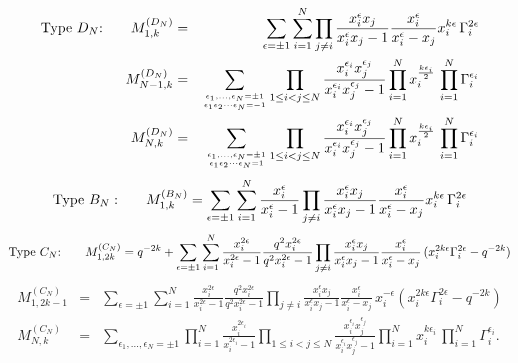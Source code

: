 \documentclass[12pt]{amsart}
\numberwithin{equation}{section}
\numberwithin{table}{section}
\begin{document}
\begin{eqnarray}\hbox{Type $D_N$:}\qquad
{M}_{1,k}^{(D_N)}&=&\sum_{\epsilon=\pm 1}\sum_{i=1}^N \prod_{j\neq i} \frac{x_i^\epsilon x_j}{x_i^\epsilon x_j-1}
\frac{x_i^\epsilon}{x_i^\epsilon-x_j} x_i^{k\epsilon}\, \Gamma_i^{2\epsilon}\nonumber\\
{M}_{N-1,k}^{(D_N)}&=&\sum_{\epsilon_1,...,\epsilon_N=\pm 1\atop \epsilon_1\epsilon_2\cdots \epsilon_N=-1}  
\prod_{1\leq i<j\leq N} \frac{x_i^{\epsilon_i} x_j^{\epsilon_j}}{x_i^{\epsilon_i}x_j^{\epsilon_j}-1} 
\prod_{i=1}^N x_i^{\frac{k\epsilon_i}{2}}\, \prod_{i=1}^N \Gamma_i^{\epsilon_i}\label{Dtwo}\\
{M}_{N,k}^{(D_N)}&=&\sum_{\epsilon_1,...,\epsilon_N=\pm 1\atop \epsilon_1\epsilon_2\cdots \epsilon_N=1}  
\prod_{1\leq i<j\leq N} \frac{x_i^{\epsilon_i} x_j^{\epsilon_j}}{x_i^{\epsilon_i}x_j^{\epsilon_j}-1} 
\prod_{i=1}^N x_i^{\frac{k\epsilon_i}{2}}\, \prod_{i=1}^N \Gamma_i^{\epsilon_i}\label{Dthree}
\end{eqnarray}
\begin{equation*}
\hbox{Type $B_N:$}\qquad {M}_{1,k}^{(B_N)}=\sum_{\epsilon=\pm 1}
\sum_{i=1}^N \frac{x_i^{\epsilon}}{x_i^{\epsilon}-1}
\prod_{j\neq i} \frac{x_i^{\epsilon} x_j}{x_i^{\epsilon}x_j-1}\frac{x_i^{\epsilon} }{x_i^{\epsilon}-x_j}
x_i^{k\epsilon}\,\Gamma_i^{2\epsilon}
\end{equation*}
\begin{equation*}
\hbox{Type $C_N$:}\qquad{M}_{1,2k}^{(C_N)}=q^{-2k}+ \sum_{\epsilon=\pm 1}\sum_{i=1}^N \frac{x_i^{2\epsilon}}{x_i^{2\epsilon}-1} 
\frac{q^2 x_i^{2\epsilon}}{q^2 x_i^{2\epsilon}-1} \prod_{j\neq i}  \frac{x_i^{\epsilon}x_j}{x_i^{\epsilon}x_j-1}
 \frac{x_i^{\epsilon}}{x_i^{\epsilon}-x_j} \, (x_i^{2k\epsilon}\Gamma_i^{2\epsilon}-q^{-2k})
 \end{equation*}
 \begin{eqnarray}
{M}_{1,2k-1}^{(C_N)}&=&\sum_{\epsilon=\pm 1}\sum_{i=1}^N \frac{x_i^{2\epsilon}}{x_i^{2\epsilon}-1} 
\frac{q^2 x_i^{2\epsilon}}{q^2 x_i^{2\epsilon}-1} \prod_{j\neq i}  \frac{x_i^{\epsilon}x_j}{x_i^{\epsilon}x_j-1}
 \frac{x_i^{\epsilon}}{x_i^{\epsilon}-x_j} \, x_i^{-\epsilon}(x_i^{2k\epsilon} \Gamma_i^{2\epsilon}-q^{-2k})\nonumber \\
{M}_{N,k}^{(C_N)}&=&\sum_{\epsilon_1,...,\epsilon_N=\pm 1}\prod_{i=1}^N
\frac{x_i^{2\epsilon_i}}{x_i^{2\epsilon_i}-1} 
 \prod_{1\leq i<j\leq N}  \frac{x_i^{\epsilon_i}x_j^{\epsilon_j}}{x_i^{\epsilon_i}x_j^{\epsilon_j}-1}
\prod_{i=1}^N x_i^{k\epsilon_i}\,\prod_{i=1}^N \Gamma_i^{\epsilon_i}.\label{Cthree}
\end{eqnarray}
\end{document}
